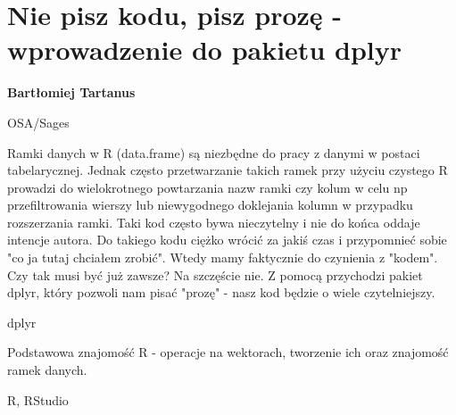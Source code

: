 \documentclass[\main/boa.tex]{subfiles}
\begin{document}
\section{Nie pisz kodu, pisz prozę - wprowadzenie do pakietu dplyr}

\begin{minipage}{0.915\textwidth}
\centering
{\bf {} Bartłomiej Tartanus}
\end{minipage}

\vskip 0.3cm

\begin{affiliations}
\begin{minipage}{0.915\textwidth}
\centering
\large OSA/Sages  \\[2pt]
\end{minipage}
\end{affiliations}

\vskip 0.8cm

\opiswarsztatu Ramki danych w R (data.frame) są niezbędne do pracy z danymi w postaci tabelarycznej. Jednak często przetwarzanie takich ramek przy użyciu czystego R prowadzi do wielokrotnego powtarzania nazw ramki czy kolum w celu np przefiltrowania wierszy lub niewygodnego doklejania kolumn w przypadku rozszerzania ramki. Taki kod często bywa nieczytelny i nie do końca oddaje intencje autora. Do takiego kodu ciężko wrócić za jakiś czas i przypomnieć sobie "co ja tutaj chciałem zrobić". Wtedy mamy faktycznie do czynienia z "kodem". Czy tak musi być już zawsze? Na szczęście nie. Z pomocą przychodzi pakiet dplyr, który pozwoli nam pisać "prozę" - nasz kod będzie o wiele czytelniejszy.	 

\pakiety dplyr

\umiejetnosci Podstawowa znajomość R - operacje na wektorach, tworzenie ich oraz znajomość ramek danych.

\wymagania R, RStudio
\end{document}
